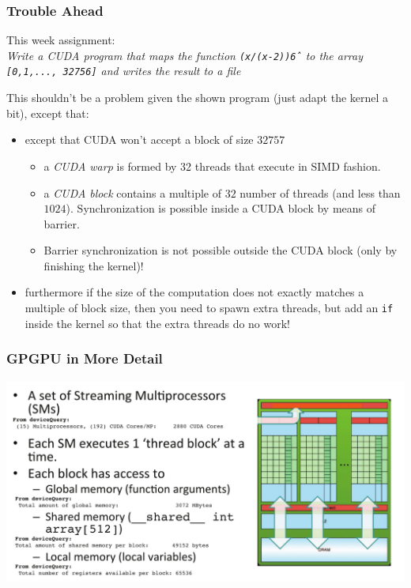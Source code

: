 \documentclass{beamer}
\newcommand{\emp}[1]{\textcolor{DikuRed}{ #1}}
\begin{document}
\begin{frame}[fragile,t]
\frametitle{Trouble Ahead}

This week assignment:\\
{\em Write a CUDA program that maps the function
{\tt (x/(x-2))\^6} to the array {\tt [0,1,..., 32756]} and writes the result
to a file}

\bigskip

This shouldn't be a problem given the shown program 
            (just adapt the kernel a bit), except that:
\begin{itemize}
    \item except that CUDA won't accept a block of size $32757$
        \begin{itemize}
            \item a \emp{\em CUDA warp} is formed by 32 threads that execute in SIMD fashion.
            \item a \emp{\em CUDA block} contains a multiple of $32$ number of threads 
                    (and less than $1024$).  Synchronization is possible inside a
                    CUDA block by means of barrier.
            \item Barrier synchronization is not possible outside the CUDA block
                    (only by finishing the kernel)!
        \end{itemize}
    \item furthermore if the size of the computation does not exactly matches
            a multiple of block size, then you need to spawn extra threads, but
            add an {\tt if} inside the kernel so that the extra threads do no work!
\end{itemize}
\end{frame}

\begin{frame}[fragile,t]
\frametitle{GPGPU in More Detail}

\begin{center}
\includegraphics[height=35ex]{Figures/Lab1/GPUorg.pdf}
\end  {center}

\end{frame}
\end{document}
